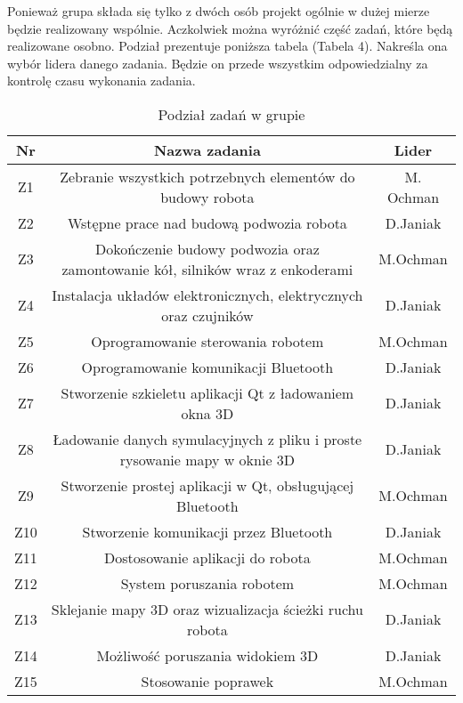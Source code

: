 Ponieważ grupa składa się tylko z dwóch osób projekt ogólnie w dużej mierze będzie realizowany wspólnie. Aczkolwiek można wyróżnić część zadań, które będą realizowane osobno. Podział prezentuje poniższa tabela (Tabela 4). Nakreśla ona wybór lidera danego zadania. Będzie on przede wszystkim odpowiedzialny za kontrolę czasu wykonania zadania.



\begin{table}[!htbp]
\begin{center}
\begin{tabular}{|c|c|c|}

\hline
\textbf{Nr} & \textbf{Nazwa zadania} & \textbf{Lider} \\ \hline\hline
Z1 & Zebranie wszystkich potrzebnych elementów do budowy robota & M. Ochman \\ \hline
Z2 & Wstępne prace nad budową podwozia robota & D.Janiak \\ \hline
Z3 & Dokończenie budowy podwozia oraz zamontowanie kół, silników wraz z enkoderami & M.Ochman \\ \hline
Z4 & Instalacja układów elektronicznych, elektrycznych oraz czujników & D.Janiak \\ \hline
Z5 & Oprogramowanie sterowania robotem & M.Ochman \\ \hline
Z6 & Oprogramowanie komunikacji Bluetooth & D.Janiak \\ \hline
Z7 & Stworzenie szkieletu aplikacji Qt z ładowaniem okna 3D & D.Janiak \\ \hline
Z8 & Ładowanie danych symulacyjnych z pliku i proste rysowanie mapy w oknie 3D & D.Janiak \\ \hline
Z9 & Stworzenie prostej aplikacji w Qt, obsługującej Bluetooth & M.Ochman \\ \hline
Z10 & Stworzenie komunikacji przez Bluetooth & D.Janiak \\ \hline
Z11 & Dostosowanie aplikacji do robota & M.Ochman \\ \hline
Z12 & System poruszania robotem & M.Ochman \\ \hline
Z13 & Sklejanie mapy 3D oraz wizualizacja ścieżki ruchu robota & D.Janiak \\ \hline
Z14 & Możliwość poruszania widokiem 3D & D.Janiak \\ \hline
Z15 & Stosowanie poprawek & M.Ochman \\ \hline

\end{tabular}
\caption{Podział zadań w grupie}
\end{center}
\end{table}

